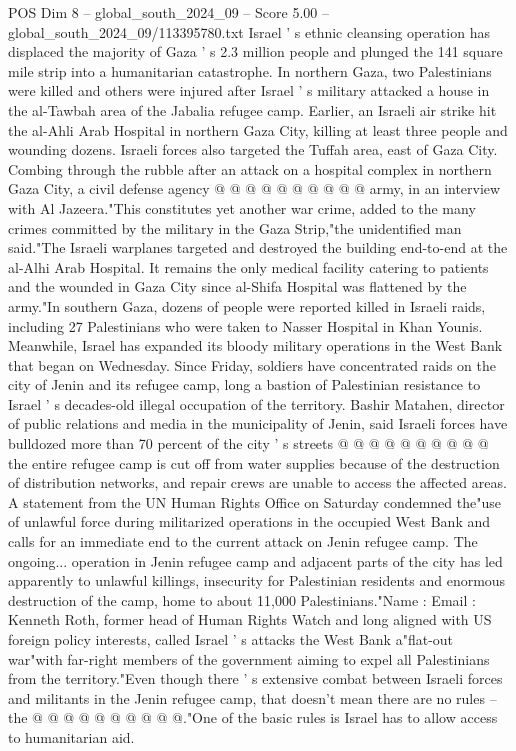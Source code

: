 \begin{textsample}{POS Dim 8 – global\_south\_2024\_09 – Score 5.00 – global\_south\_2024\_09/113395780.txt}
Israel ' s ethnic cleansing operation has displaced the majority of Gaza ' s 2.3 million people and plunged the 141 square mile strip into a humanitarian catastrophe.
In northern Gaza, two Palestinians were killed and others were injured after Israel ' s military attacked a house in the al-Tawbah area of the Jabalia refugee camp.
Earlier, an Israeli air strike hit the al-Ahli Arab Hospital in northern Gaza City, killing at least three people and wounding dozens.
Israeli forces also targeted the Tuffah area, east of Gaza City.
Combing through the rubble after an attack on a hospital complex in northern Gaza City, a civil defense agency @ @ @ @ @ @ @ @ @ @ army, in an interview with Al Jazeera."This constitutes yet another war crime, added to the many crimes committed by the military in the Gaza Strip,"the unidentified man said."The Israeli warplanes targeted and destroyed the building end-to-end at the al-Alhi Arab Hospital.
It remains the only medical facility catering to patients and the wounded in Gaza City since al-Shifa Hospital was flattened by the army."In southern Gaza, dozens of people were reported killed in Israeli raids, including 27 Palestinians who were taken to Nasser Hospital in Khan Younis.
Meanwhile, Israel has expanded its bloody military operations in the West Bank that began on Wednesday.
Since Friday, soldiers have concentrated raids on the city of Jenin and its refugee camp, long a bastion of Palestinian resistance to Israel ' s decades-old illegal occupation of the territory.
Bashir Matahen, director of public relations and media in the municipality of Jenin, said Israeli forces have bulldozed more than 70 percent of the city ' s streets @ @ @ @ @ @ @ @ @ @ the entire refugee camp is cut off from water supplies because of the destruction of distribution networks, and repair crews are unable to access the affected areas.
A statement from the UN Human Rights Office on Saturday condemned the"use of unlawful force during militarized operations in the occupied West Bank and calls for an immediate end to the current attack on Jenin refugee camp.
The ongoing... operation in Jenin refugee camp and adjacent parts of the city has led apparently to unlawful killings, insecurity for Palestinian residents and enormous destruction of the camp, home to about 11,000 Palestinians."Name : Email : Kenneth Roth, former head of Human Rights Watch and long aligned with US foreign policy interests, called Israel ' s attacks the West Bank a"flat-out war"with far-right members of the government aiming to expel all Palestinians from the territory."Even though there ' s extensive combat between Israeli forces and militants in the Jenin refugee camp, that doesn't mean there are no rules -- the @ @ @ @ @ @ @ @ @ @."One of the basic rules is Israel has to allow access to humanitarian aid.

\end{textsample}
